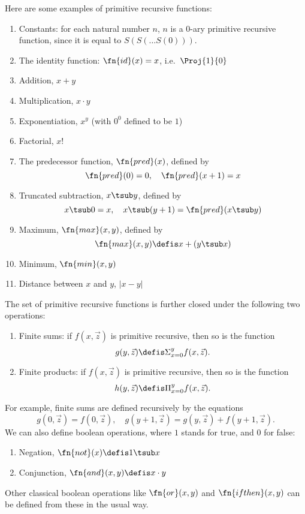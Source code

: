 \documentclass[../../include/open-logic-section]{subfiles}
\begin{document}


Here are some examples of primitive recursive functions:
\begin{enumerate}
\item Constants: for each natural number $n$, $n$ is a 0-ary primitive
  recursive function, since it is equal to $S(S(\dots S(0)))$.

\item The identity function: $\fn{id}(x) = x$, i.e.\ $\Proj{1}{0}$

\item Addition, $x+y$

\item Multiplication, $x \cdot y$

\item Exponentiation, $x^y$ (with $0^0$ defined to be $1$)

\item Factorial, $x!$

\item The predecessor function, $\fn{pred}(x)$, defined by
\[
\fn{pred}(0) = 0, \quad \fn{pred}(x+1) = x
\]

\item Truncated subtraction, $x \tsub y$, defined by 
\[
x \tsub 0 = x, \quad x \tsub (y+1) = \fn{pred}(x \tsub y)
\]

\item Maximum, $\fn{max}(x,y)$, defined by 
\[
\fn{max}(x,y) \defis x + (y \tsub x)
\]

\item Minimum, $\fn{min}(x,y)$

\item Distance between $x$ and $y$, $|x-y|$
\end{enumerate}

The set of primitive recursive functions is further closed under the
following two operations:
\begin{enumerate}
\item Finite sums: if $f(x,\vec z)$ is primitive recursive, then so is the
function 
\[
g(y,\vec z) \defis \Sigma_{x = 0}^y f(x,\vec z).
\]
\item Finite products: if $f(x,\vec z)$ is primitive recursive, then so is the
function 
\[
h(y,\vec z) \defis \Pi_{x = 0}^y f(x,\vec z).
\]
\end{enumerate}
For example, finite sums are defined recursively by the equations
\[
g(0,\vec z) = f(0,\vec z), \quad g(y+1,\vec z) = g(y,\vec z) +
f(y+1,\vec z).
\]
We can also define boolean operations, where $1$ stands for true, and
$0$ for false:
\begin{enumerate}
\item Negation, $\fn{not}(x) \defis 1 \tsub x$
\item Conjunction, $\fn{and}(x,y) \defis x \cdot y$
\end{enumerate}
Other classical boolean operations like $\fn{or}(x,y)$ and
$\fn{ifthen}(x,y)$ can be defined from these in the usual way.
\end{document}
